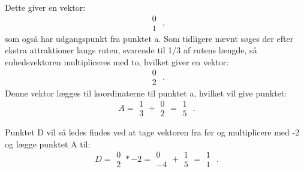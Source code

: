 Dette giver en vektor: 
\[\ \begin{matrix} 0 \\ 1 \end{matrix} \text{ ,} \]
som også har udgangspunkt fra punktet a. Som tidligere nævnt søges der efter ekstra attraktioner langs ruten, svarende til 1/3 af rutens længde, så enhedsvektoren multipliceres med to, hvilket giver en vektor: 
\[\ \begin{matrix} 0 \\ 2 \end{matrix} \textbf{ .} \]
Denne vektor lægges til koordinaterne til punktet a, hvilket vil give punktet:
\[\ A = \begin{matrix} 1 \\ 3 \end{matrix} + \begin{matrix} 0 \\ 2 \end{matrix} = \begin{matrix} 1 \\ 5 \end{matrix} \text{ .} \]

Punktet D vil så ledes findes  ved at tage vektoren fra før og multiplicere med -2 og lægge punktet A til:
\[\ D = \begin{matrix} 0 \\ 2 \end{matrix} * -2 = \begin{matrix} 0 \\ -4 \end{matrix} + \begin{matrix} 1 \\ 5 \end{matrix} = \begin{matrix} 1 \\ 1 \end{matrix} \text{ .} \]



